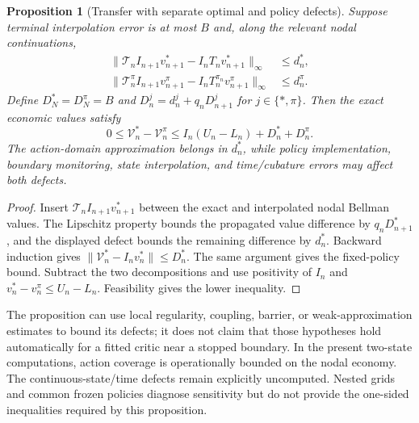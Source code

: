 \documentclass[ecta,nameyear,draft]{econsocart}
\newtheorem{proposition}[theorem]{Proposition}
\theoremstyle{definition}
\theoremstyle{remark}
\begin{document}
\begin{proposition}[Transfer with separate optimal and policy defects]
Suppose terminal interpolation error is at most $B$ and, along the relevant nodal continuations,
\begin{align*}
 \|\mathcal T_n I_{n+1}v_{n+1}^*-I_nT_nv_{n+1}^*\|_\infty&\leq d_n^*,\\
 \|\mathcal T_n^{\pi}I_{n+1}v_{n+1}^{\pi}-I_nT_n^{\pi_n}v_{n+1}^{\pi}\|_\infty&\leq d_n^{\pi}.
\end{align*}
Define $D_N^*=D_N^{\pi}=B$ and $D_n^j=d_n^j+q_nD_{n+1}^j$ for $j\in\{*,\pi\}$. Then the exact economic values satisfy
\[
 0\leq\mathcal V_n^*-\mathcal V_n^{\pi}
 \leq I_n(U_n-L_n)+D_n^*+D_n^{\pi}.
\]
The action-domain approximation belongs in $d_n^*$, while policy implementation, boundary monitoring, state interpolation, and time/cubature errors may affect both defects.
\end{proposition}
\begin{proof}
Insert $\mathcal T_n I_{n+1}v_{n+1}^*$ between the exact and interpolated nodal Bellman values. The Lipschitz property bounds the propagated value difference by $q_nD_{n+1}^*$, and the displayed defect bounds the remaining difference by $d_n^*$. Backward induction gives $\|\mathcal V_n^*-I_nv_n^*\|\leq D_n^*$. The same argument gives the fixed-policy bound. Subtract the two decompositions and use positivity of $I_n$ and $v_n^*-v_n^{\pi}\leq U_n-L_n$. Feasibility gives the lower inequality.
\end{proof}
The proposition can use local regularity, coupling, barrier, or weak-approximation estimates to bound its defects; it does not claim that those hypotheses hold automatically for a fitted critic near a stopped boundary. In the present two-state computations, action coverage is operationally bounded on the nodal economy. The continuous-state/time defects remain explicitly uncomputed. Nested grids and common frozen policies diagnose sensitivity but do not provide the one-sided inequalities required by this proposition.
\end{document}
